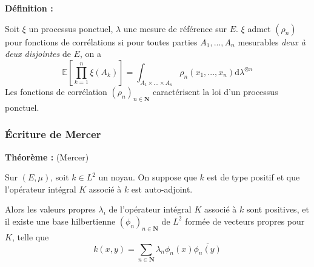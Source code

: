 \documentclass[9pt]{beamer}
\begin{document}
\begin{frame}
    \textbf{Définition :}

    Soit $\xi $ un processus ponctuel, $ \lambda $ une mesure de référence sur $E$. $ \xi $  admet $(\rho_n) $ pour fonctions de corrélations si pour toutes parties $A_1,...,A_n$ mesurables \textit{deux à deux disjointes} de $E$, on a $$ \mathbb E \left[ \prod_{k=1}^n \xi(A_k) \right] = \int_{A_1\times ... \times A_n} \rho_n(x_1,...,x_n) \mathrm d \lambda^{\otimes n} $$ Les fonctions de corrélation $ (\rho_n)_{n \in \mathbf N}$ caractérisent la loi d'un processus ponctuel.

\end{frame}\begin{frame}\frametitle{Écriture de Mercer}

    \textbf{Théorème :} (Mercer)

    \bigskip

    Sur $ (E, \mu) $, soit $ k \in L^2 $ un noyau. On suppose que $k$ est de type positif et que l'opérateur intégral $K$ associé à $k$ est auto-adjoint.

    \bigskip

    Alors les valeurs propres $ \lambda_i $ de l'opérateur intégral $K$ associé à $k$ sont positives, et il existe une base hilbertienne $(\phi_n)_{n\in\mathbf N}$ de $L^2$ formée de vecteurs propres pour $K$, telle que 
    \[
        k(x,y) = \sum_{n \in \mathbf N} \lambda_n \phi_n(x) \overline{\phi_n(y)} 
    \]

\end{frame}
\end{document}

